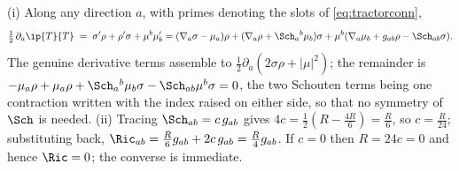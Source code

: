 (i) Along any direction $a$, with primes denoting the slots of \eqref{eq:tractorconn},
\[
\tfrac12\,\partial_a \ip{T}{T} \;=\; \sigma'\rho + \rho'\sigma + \mu^b\mu'_b
= (\nabla_a\sigma - \mu_a)\rho + (\nabla_a\rho + \Sch_a{}^b\mu_b)\sigma + \mu^b(\nabla_a\mu_b + g_{ab}\rho - \Sch_{ab}\sigma).
\]
The genuine derivative terms assemble to $\tfrac12\partial_a(2\sigma\rho + |\mu|^2)$; the remainder is $-\mu_a\rho + \mu_a \rho + \Sch_a{}^b\mu_b\sigma - \Sch_{ab}\mu^b\sigma = 0$, the two Schouten terms being one contraction written with the index raised on either side, so that no symmetry of $\Sch$ is needed.
(ii) Tracing $\Sch_{ab} = c\,g_{ab}$ gives $4c = \tfrac12(R - \tfrac{4R}{6}) = \tfrac{R}{6}$, so $c = \tfrac{R}{24}$; substituting back, $\Ric_{ab} = \tfrac{R}{6}g_{ab} + 2c\,g_{ab} = \tfrac{R}{4}g_{ab}$. If $c = 0$ then $R = 24c = 0$ and hence $\Ric = 0$; the converse is immediate.
